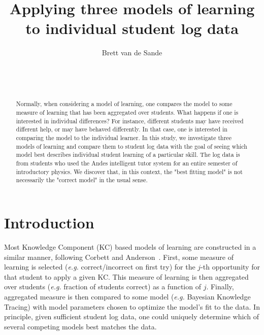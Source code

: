 \documentclass{edm_template}
\begin{document}
\title{Applying three models of learning to individual student log data}
\author{
\alignauthor
      Brett van de Sande\\
       \\
       \\
       \\
}

\maketitle

\begin{abstract}
Normally, when considering a model of learning, one compares the model
to some measure of learning that has been aggregated over students.
What happens if one is interested in individual differences?  For
instance, different students may have received different help, or may
have behaved differently.  In that case, one is interested in
comparing the model to the individual learner.  In this study, we
investigate three models of learning and compare them to student log
data with the goal of seeing which model best describes individual
student learning of a particular skill.  The log data is from students
who used the Andes intelligent tutor system for an entire semester of
introductory physics.  We discover that, in this context, the "best
fitting model" is not necessarily the "correct model" in the usual
sense.
\end{abstract}



\section{Introduction}


Most Knowledge Component (KC) \cite{vanlehn_behavior_2006}
based models of learning are constructed
in a similar manner, following Corbett and Anderson~\citeyear{corbett_knowledge_1995}.
First, some measure of learning is selected ({\em e.g.} correct/incorrect
on first try) for the $j$-th opportunity for that student to apply a given KC.  
This measure of learning is then aggregated over students 
({\em e.g.} fraction of students correct) as a function of $j$.
Finally, aggregated measure is then compared to some model
({\em e.g.} Bayesian Knowledge Tracing) with model parameters
chosen to optimize the model's fit to the data.
In principle, given sufficient student log data, one could uniquely
determine which of several competing models best matches the
data.
\end{document}
